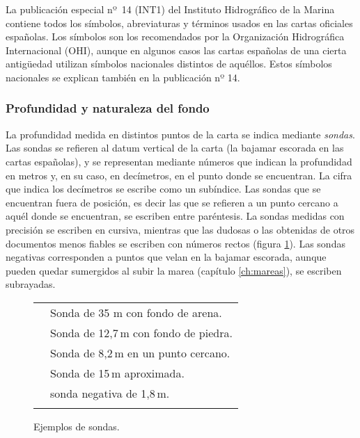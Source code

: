 La publicación especial nº~14 (INT1) del Instituto Hidrográfico de la Marina contiene 
todos los símbolos, abreviaturas y términos usados en las cartas oficiales españolas. Los 
símbolos son los recomendados por la Organización Hidrográfica Internacional (OHI), 
aunque en algunos casos las cartas españolas de una cierta antigüedad utilizan símbolos 
nacionales distintos de aquéllos. Estos símbolos nacionales se explican también en la 
publicación nº 14. 

\subsubsection{Profundidad y naturaleza del fondo}

La profundidad medida en distintos puntos de la carta se indica mediante \emph{sondas}. 
Las sondas se refieren al datum vertical de la carta (la bajamar escorada en las cartas 
españolas), y se representan mediante números que indican la profundidad en metros y, en su 
caso, en decímetros, en el punto donde se encuentran. La cifra que indica 
los decímetros se escribe como un subíndice. Las sondas que se encuentran 
fuera de posición, es decir las que se refieren a un punto cercano a aquél 
donde se encuentran, se escriben entre paréntesis. La sondas medidas con 
precisión se escriben en cursiva, mientras que las dudosas o las 
obtenidas de otros documentos menos fiables se escriben con números rectos 
(figura \ref{fg:sondas}). Las sondas negativas corresponden a 
puntos que velan en la bajamar escorada, aunque pueden quedar sumergidos 
al subir la marea (capítulo \ref{ch:mareas}), se escriben subrayadas. 

\begin{figure}[htbp]
\begin{center}
\begin{tabular}{>{\itshape\color{blue}}m{1cm} >{\upshape}m{6cm}}\toprule
{35 \newline S} & Sonda de 35 m con fondo de arena.     \\ \addlinespace[1ex]
{12\textsubscript{7} \newline St} & Sonda de 12,7\,m con fondo de piedra.\\ \addlinespace[1ex]
{(8\textsubscript{2}) } &  Sonda de 8,2\,m en un punto cercano. \\ \addlinespace[1ex]
{\upshape 15} & Sonda de 15\,m aproximada.\\ \addlinespace[1ex]
{\underline{1\textsubscript8} } & sonda negativa de 1,8\,m.\\ \addlinespace[1ex]
\bottomrule
\end{tabular}
\caption{Ejemplos de sondas.}
\label{fg:sondas}
\end{center}
\end{figure}

